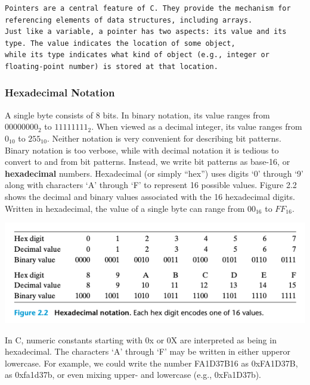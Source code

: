 \documentclass[11pt]{article}
\begin{document}
\begin{verbatim}
Pointers are a central feature of C. They provide the mechanism for referencing elements of data structures, including arrays.
Just like a variable, a pointer has two aspects: its value and its type. The value indicates the location of some object,
while its type indicates what kind of object (e.g., integer or floating-point number) is stored at that location.
\end{verbatim}

\subsubsection{Hexadecimal Notation}
\label{sec:org99ffb7a}
A single byte consists of 8 bits. In binary notation, its value ranges from \(00000000_2\) to \(11111111_2\). When viewed as a decimal integer, its value ranges from \(0_{10}\) to \(255_{10}\). Neither notation is very convenient for describing bit patterns. Binary notation is too verbose, while with decimal notation it is tedious to convert to and from bit patterns. Instead, we write bit patterns as base-16, or \textbf{hexadecimal} numbers. Hexadecimal (or simply “hex”) uses digits ‘0’ through ‘9’ along with characters ‘A’ through ‘F’ to represent 16 possible values. Figure 2.2 shows the decimal and binary values associated with the 16 hexadecimal digits. Written in hexadecimal, the value of a single byte can range from \(00_{16}\) to \(FF_{16}\).\\


\begin{center}
\includegraphics[width=.9\linewidth]{pics/hexidecimal-notation.png}
\end{center}



In C, numeric constants starting with 0x or 0X are interpreted as being in hexadecimal. The characters ‘A’ through ‘F’ may be written in either upperor lowercase. For example, we could write the number FA1D37B16 as 0xFA1D37B, as 0xfa1d37b, or even mixing upper- and lowercase (e.g., 0xFa1D37b).\\
\end{document}
